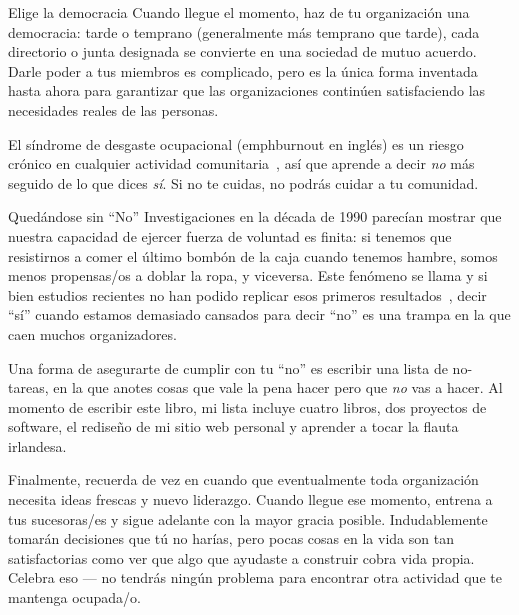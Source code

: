 \begin{aside}{Elige la democracia}
  Cuando llegue el momento,
  haz de tu organización una democracia:
  tarde o temprano (generalmente más temprano que tarde),
  cada directorio o junta designada se convierte en una sociedad de mutuo acuerdo.
  Darle poder a tus miembros es complicado,
  pero es la única forma inventada hasta ahora para garantizar
  que las organizaciones continúen satisfaciendo las necesidades reales de las personas.
\end{aside}


El síndrome de desgaste ocupacional (emph{burnout} en inglés) es un riesgo crónico en cualquier actividad comunitaria~\cite{Pign2016},
así que aprende a decir \emph{no} más seguido de lo que dices \emph{sí}.
Si no te cuidas,
no podrás cuidar a tu comunidad.

\begin{aside}{Quedándose sin ``No''}
  Investigaciones en la década de 1990 parecían mostrar que nuestra capacidad de ejercer fuerza de voluntad es finita:
  si tenemos que resistirnos a comer el último bombón de la caja cuando tenemos hambre,
  somos menos propensas/os a doblar la ropa, y viceversa.
  Este fenómeno se llama 
  y si bien estudios recientes no han podido replicar esos primeros resultados~\cite{Hagg2016},
  decir ``sí'' cuando estamos demasiado cansados para decir ``no''
  es una trampa en la que caen muchos organizadores.
\end{aside}

Una forma de asegurarte de cumplir con tu ``no''
es escribir una lista de no-tareas, en la que anotes cosas que vale la pena hacer
pero que \emph{no} vas a hacer.
Al momento de escribir este libro, mi lista incluye cuatro libros,
dos proyectos de software,
el rediseño de mi sitio web personal
y aprender a tocar la flauta irlandesa. 

Finalmente,
recuerda de vez en cuando que
eventualmente toda organización necesita ideas frescas y nuevo liderazgo.
Cuando llegue ese momento,
entrena a tus sucesoras/es y sigue adelante con la mayor gracia posible.
Indudablemente tomarán decisiones que tú no harías,
pero pocas cosas en la vida son tan satisfactorias como 
ver que algo que ayudaste a construir cobra vida propia.
Celebra eso --- no tendrás ningún problema para encontrar otra actividad que te mantenga ocupada/o.

